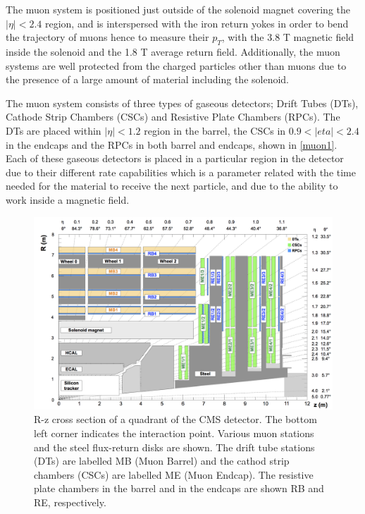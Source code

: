 The muon system is positioned just outside of the solenoid magnet covering the $|\eta| < 2.4$ region, and is interspersed with the iron return yokes in order to bend the trajectory of muons hence to measure their $p_T$, with the 3.8 T magnetic field inside the solenoid and the 1.8 T average return field. Additionally, the muon systems are well protected from the charged particles other than muons due to the presence of a large amount of material including the solenoid.

The  muon system consists of three types of gaseous detectors; Drift Tubes (DTs), Cathode Strip Chambers (CSCs) and Resistive Plate Chambers (RPCs). The DTs are placed within $|\eta| < 1.2$ region in the barrel, the CSCs in $0.9<|eta|<2.4$ in the endcaps and the RPCs in both barrel and endcaps, shown in \autoref{muon1}. Each of these gaseous detectors is placed in a particular region in the detector due to their different rate capabilities which is a parameter related with the time needed for the material to receive the next particle, and due to the ability to work inside a magnetic field.

\begin{figure}[ht]
	\centering
	\includegraphics[width=\textwidth]{MSc_Thesis/fig/muon1.png}
	\vspace{2mm}
	\caption[R-z cross section of a quadrant of the CMS detector. The bottom left corner indicates the interaction point. Various muon stations and the steel flux-return disks are shown. The drift tube stations (DTs) are labelled MB (Muon Barrel) and the cathod strip chambers (CSCs) are labelled ME (Muon Endcap). The resistive plate chambers in the barrel and in the endcaps are shown RB and RE, respectively.]{R-z cross section of a quadrant of the CMS detector. The bottom left corner indicates the interaction point. Various muon stations and the steel flux-return disks are shown. The drift tube stations (DTs) are labelled MB (Muon Barrel) and the cathod strip chambers (CSCs) are labelled ME (Muon Endcap). The resistive plate chambers in the barrel and in the endcaps are shown RB and RE, respectively\cite{muon1}.}
	\label{muon1}
\end{figure}

